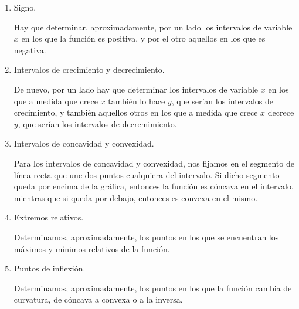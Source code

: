 \begin{enumerate}[leftmargin=*]
\begin{enumerate}
\begin{enumerate}
\item Signo.
\begin{indicacion}
Hay que determinar, aproximadamente, por un lado los intervalos de variable $x$ en los que la función es positiva, y por el otro aquellos en
los que es negativa.
\end{indicacion}

\item  Intervalos de crecimiento y decrecimiento.
\begin{indicacion}
De nuevo, por un lado hay que determinar los intervalos de variable $x$ en los que a medida que crece $x$ también lo hace $y$, que serían
los intervalos de crecimiento, y también aquellos otros en los que a medida que crece $x$ decrece $y$, que serían los intervalos de
decremimiento.
\end{indicacion}

\item Intervalos de concavidad y convexidad.
\begin{indicacion}
Para los intervalos de concavidad y convexidad, nos fijamos en el segmento de línea recta que une dos puntos cualquiera del intervalo. Si
dicho segmento queda por encima de la gráfica, entonces la función es cóncava en el intervalo, mientras que si queda por debajo, entonces es
convexa en el mismo.
\end{indicacion}

\item Extremos relativos.
\begin{indicacion}
Determinamos, aproximadamente, los puntos en los que se encuentran los máximos y mínimos relativos de la función.
\end{indicacion}

\item Puntos de inflexión.
\begin{indicacion}
Determinamos, aproximadamente, los puntos en los que la función cambia de curvatura, de cóncava a convexa o a la inversa.
\end{indicacion}
\end{enumerate}
\end{enumerate}


\end{enumerate}
